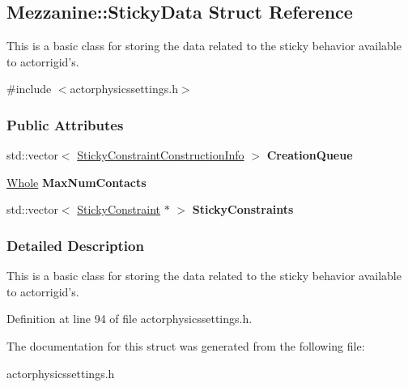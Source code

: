 \hypertarget{structMezzanine_1_1StickyData}{
\subsection{Mezzanine::StickyData Struct Reference}
\label{structMezzanine_1_1StickyData}
}


This is a basic class for storing the data related to the sticky behavior available to actorrigid's.  




{\ttfamily \#include $<$actorphysicssettings.h$>$}

\subsubsection*{Public Attributes}
\begin{DoxyCompactItemize}
\item 
\hypertarget{structMezzanine_1_1StickyData_aaed273a771f01553ee4ee8f6d36020d7}{
std::vector$<$ \hyperlink{structMezzanine_1_1StickyConstraintConstructionInfo}{StickyConstraintConstructionInfo} $>$ {\bfseries CreationQueue}}
\label{structMezzanine_1_1StickyData_aaed273a771f01553ee4ee8f6d36020d7}

\item 
\hypertarget{structMezzanine_1_1StickyData_a187bcd953ed41f4af50562255f633ba5}{
\hyperlink{namespaceMezzanine_adcbb6ce6d1eb4379d109e51171e2e493}{Whole} {\bfseries MaxNumContacts}}
\label{structMezzanine_1_1StickyData_a187bcd953ed41f4af50562255f633ba5}

\item 
\hypertarget{structMezzanine_1_1StickyData_aa1cb4315a53c06374f66d213558a2c56}{
std::vector$<$ \hyperlink{classMezzanine_1_1Generic6DofConstraint}{StickyConstraint} $\ast$ $>$ {\bfseries StickyConstraints}}
\label{structMezzanine_1_1StickyData_aa1cb4315a53c06374f66d213558a2c56}

\end{DoxyCompactItemize}


\subsubsection{Detailed Description}
This is a basic class for storing the data related to the sticky behavior available to actorrigid's. 

Definition at line 94 of file actorphysicssettings.h.



The documentation for this struct was generated from the following file:\begin{DoxyCompactItemize}
\item 
actorphysicssettings.h\end{DoxyCompactItemize}

